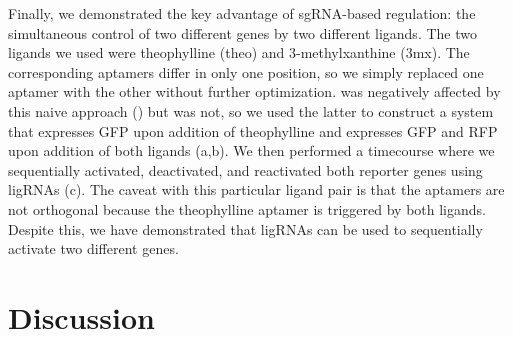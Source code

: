 \documentclass[10pt,oneside]{article}
\begin{document}
Finally, we demonstrated the key advantage of sgRNA-based regulation: the simultaneous control of two different genes by two different ligands.  The two ligands we used were theophylline (theo) and 3-methylxanthine (3mx).  The corresponding aptamers differ in only one position, so we simply replaced one aptamer with the other without further optimization.  \ligrnaF was negatively affected by this naive approach () but \ligrnaB was not, so we used the latter to construct a system that expresses GFP upon addition of theophylline and expresses GFP and RFP upon addition of both ligands (a,b).  We then performed a timecourse where we sequentially activated, deactivated, and reactivated both reporter genes using ligRNAs (c).  The caveat with this particular ligand pair is that the aptamers are not orthogonal because the theophylline aptamer is triggered by both ligands.  Despite this, we have demonstrated that ligRNAs can be used to sequentially activate two different genes.
% 
% 
% 
% 
% 
%
% 
% 
% 
%

\section{Discussion}

\end{document}
